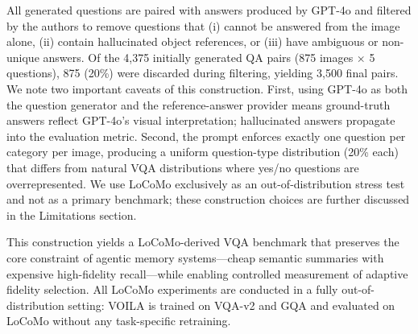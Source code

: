 All generated questions are paired with answers produced by GPT-4o and filtered by the authors to remove questions that (i) cannot be answered from the image alone, (ii) contain hallucinated object references, or (iii) have ambiguous or non-unique answers.
Of the 4{,}375 initially generated QA pairs (875 images × 5 questions), 875 (20\%) were discarded during filtering, yielding 3{,}500 final pairs.
We note two important caveats of this construction.
First, using GPT-4o as both the question generator and the reference-answer provider means ground-truth answers reflect GPT-4o's visual interpretation; hallucinated answers propagate into the evaluation metric.
Second, the prompt enforces exactly one question per category per image, producing a uniform question-type distribution (20\% each) that differs from natural VQA distributions where yes/no questions are overrepresented.
We use LoCoMo exclusively as an out-of-distribution stress test and not as a primary benchmark; these construction choices are further discussed in the Limitations section.

This construction yields a LoCoMo-derived VQA benchmark that preserves the core constraint of agentic memory systems---cheap semantic summaries with expensive high-fidelity recall---while enabling controlled measurement of adaptive fidelity selection.
All LoCoMo experiments are conducted in a fully out-of-distribution setting: \textsc{VOILA} is trained on VQA-v2 and GQA and evaluated on LoCoMo without any task-specific retraining.
